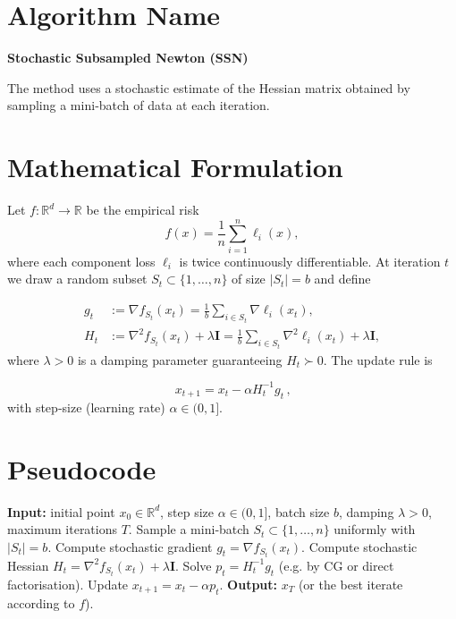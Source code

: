 \documentclass{article}
\newcommand{\Id}{\mathbf I}
\begin{document}
\section*{Algorithm Name}
\textbf{Stochastic Subsampled Newton (SSN)}  

The method uses a stochastic estimate of the Hessian matrix obtained by sampling a mini‑batch of data at each iteration.  

\section*{Mathematical Formulation}
Let $f:\mathbb{R}^d\to\mathbb{R}$ be the empirical risk 
\[
f(x)=\frac1n\sum_{i=1}^n \ell_i(x),
\]
where each component loss $\ell_i$ is twice continuously differentiable.  
At iteration $t$ we draw a random subset $S_t\subset\{1,\dots,n\}$ of size $|S_t|=b$ and define  

\[
\begin{aligned}
g_t &:= \nabla f_{S_t}(x_t)=\frac1b\sum_{i\in S_t}\nabla \ell_i(x_t),\\[4pt]
H_t &:= \nabla^2 f_{S_t}(x_t)+\lambda \Id
      =\frac1b\sum_{i\in S_t}\nabla^2 \ell_i(x_t)+\lambda \Id,
\end{aligned}
\]
where $\lambda>0$ is a damping parameter guaranteeing $H_t\succ0$.  
The update rule is  

\[
\boxed{\,x_{t+1}=x_t-\alpha H_t^{-1}g_t\,},
\]
with step‑size (learning rate) $\alpha\in(0,1]$.

\section*{Pseudocode}
\begin{algorithm}[H]
\caption{Stochastic Subsampled Newton (SSN)}
\begin{algorithmic}[1]
\STATE \textbf{Input:} initial point $x_0\in\mathbb{R}^d$, step size $\alpha\in(0,1]$, batch size $b$, damping $\lambda>0$, maximum iterations $T$.
    \STATE Sample a mini‑batch $S_t\subset\{1,\dots,n\}$ uniformly with $|S_t|=b$.
    \STATE Compute stochastic gradient $g_t=\nabla f_{S_t}(x_t)$.
    \STATE Compute stochastic Hessian $H_t=\nabla^2 f_{S_t}(x_t)+\lambda\Id$.
    \STATE Solve $p_t=H_t^{-1}g_t$ (e.g. by CG or direct factorisation).
    \STATE Update $x_{t+1}=x_t-\alpha p_t$.
\ENDFOR
\STATE \textbf{Output:} $x_T$ (or the best iterate according to $f$).
\end{algorithmic}
\end{algorithm}
\end{document}
